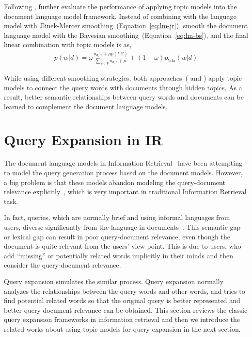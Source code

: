 
Following \cite{wei-06}, \cite{Lu-2011} further evaluate the performance of applying topic models into the document language model framework. Instead of combining with the language model with Jlinek-Mercer smoothing~(Equation~\ref{eq:lm-jr}), \cite{Lu-2011} smooth the document language model with the Bayesian smoothing~(Equation~\ref{eq:lm-bs}), and the final linear combination with topic models is as,
\begin{align}
p(w|d) = \omega \frac{n_{d,w} + \mu p(t|\mathcal{C})}{\sum_{v \in V} n_{d,v} + \mu}  + (1 - \omega) p_{\texttt{lda}}(w|d)
\end{align}

While using different smoothing strategies, both approaches~(\citep{wei-06} and \citep{Lu-2011}) apply topic models to connect the query words with documents through hidden topics. As a result, better semantic relationships between query words and documents can be learned to complement the document language models.

\section{Query Expansion in IR}

The document language models in Information Retrieval~\citep{PonteCroft} have been attempting to model the query generation process based on the document models. However, a big problem is that these models abandon modeling the query-document relevance explicitly~\citep{Lavrenko-2001}, which is very important in traditional Information Retrieval task.

In fact, queries, which are normally brief and using informal languages from users, diverse significantly from the language in documents~\citep{Muller-2009}. This semantic gap or lexical gap can result in poor query-document relevance, even though the document is quite relevant from the users' view point. This is due to users, who add ``missing'' or potentially related words implicitly in their minds and then consider the query-document relevance.

Query expansion simulates the similar process. Query expansion normally analyzes the relationships between the query words and other words, and tries to find potential related words so that the original query is better represented and better query-document relevance can be obtained. This section reviews the classic query expansion frameworks in information retrieval and then we introduce the related works about using topic models for query expansion in the next section.

